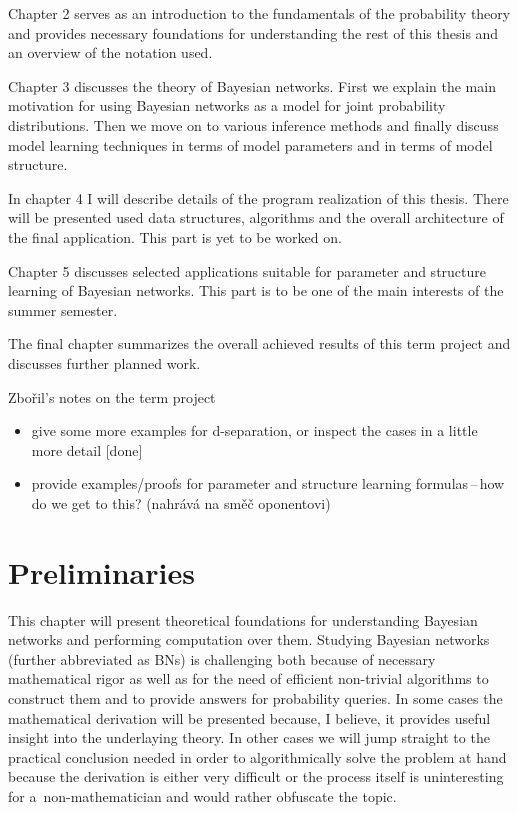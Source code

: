 \documentclass[english,cover]{fitthesis} %
\newcommand{\todo}[1]{{\color{red}#1}}
\begin{document}
\medskip

Chapter 2 serves as an introduction to the fundamentals of the probability theory and provides necessary foundations for understanding the rest of this thesis and an overview of the notation used.

Chapter 3 discusses the theory of Bayesian networks. First we explain the main motivation for using Bayesian networks as a model for joint probability distributions. Then we move on to various inference methods and finally discuss model learning techniques in terms of model parameters and in terms of model structure.

In chapter 4 I will describe details of the program realization of this thesis. There will be presented used data structures, algorithms and the overall architecture of the final application.
This part is yet to be worked on. %

Chapter 5 discusses selected applications suitable for parameter and structure learning of Bayesian networks. This part is to be one of the main interests of the summer semester.

The final chapter summarizes the overall achieved results of this term project and discusses further planned work.

\todo{Zbořil's notes on the term project
\begin{itemize}
	\item give some more examples for d-separation, or inspect the cases in a little more detail [done]
	\item provide examples/proofs for parameter and structure learning formulas\,--\,how do we get to this? (nahrává na směč oponentovi)
\end{itemize} }






























\chapter{Preliminaries}
This chapter will present theoretical foundations for understanding Bayesian networks and performing computation over them. Studying Bayesian networks (further abbreviated as BNs) is challenging both because of necessary mathematical rigor as well as for the need of efficient non-trivial algorithms to construct them and to provide answers for probability queries. In some cases the mathematical derivation will be presented because, I believe, it provides useful insight into the underlaying theory. In other cases we will jump straight to the practical conclusion needed in order to algorithmically solve the problem at hand because the derivation is either very difficult or the process itself is uninteresting for a~non-mathematician and would rather obfuscate the topic.
\end{document}
